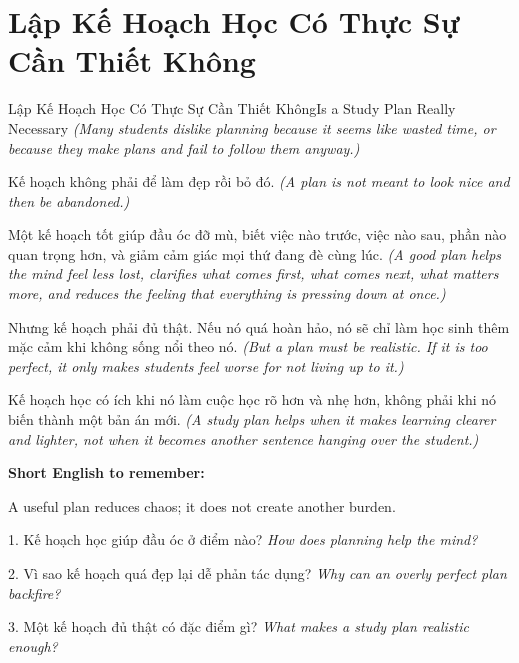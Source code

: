 \section{Lập Kế Hoạch Học Có Thực Sự Cần Thiết Không}
\begin{truyen}{Lập Kế Hoạch Học Có Thực Sự Cần Thiết Không}{Is a Study Plan Really Necessary}
\textit{(Many students dislike planning because it seems like wasted time, or because they make plans and fail to follow them anyway.)}

Kế hoạch không phải để làm đẹp rồi bỏ đó.
\textit{(A plan is not meant to look nice and then be abandoned.)}

Một kế hoạch tốt giúp đầu óc đỡ mù, biết việc nào trước, việc nào sau, phần nào quan trọng hơn, và giảm cảm giác mọi thứ đang đè cùng lúc.
\textit{(A good plan helps the mind feel less lost, clarifies what comes first, what comes next, what matters more, and reduces the feeling that everything is pressing down at once.)}

Nhưng kế hoạch phải đủ thật. Nếu nó quá hoàn hảo, nó sẽ chỉ làm học sinh thêm mặc cảm khi không sống nổi theo nó.
\textit{(But a plan must be realistic. If it is too perfect, it only makes students feel worse for not living up to it.)}
\end{truyen}

\begin{baihoc}
Kế hoạch học có ích khi nó làm cuộc học rõ hơn và nhẹ hơn, không phải khi nó biến thành một bản án mới.
\textit{(A study plan helps when it makes learning clearer and lighter, not when it becomes another sentence hanging over the student.)}
\end{baihoc}

\begin{ghinhoanh}
\textbf{Short English to remember:}

A useful plan reduces chaos; it does not create another burden.

\end{ghinhoanh}

\begin{tuhocnhanh}
1. Kế hoạch học giúp đầu óc ở điểm nào? \textit{How does planning help the mind?}

2. Vì sao kế hoạch quá đẹp lại dễ phản tác dụng? \textit{Why can an overly perfect plan backfire?}

3. Một kế hoạch đủ thật có đặc điểm gì? \textit{What makes a study plan realistic enough?}
\end{tuhocnhanh}
\ngancach

